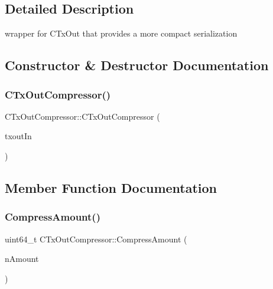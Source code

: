 \subsection{Detailed Description}
wrapper for C\+Tx\+Out that provides a more compact serialization 

\subsection{Constructor \& Destructor Documentation}
\mbox{\label{class_c_tx_out_compressor_a38ef1033989cd003de65598620d15cea}} 
\subsubsection{\texorpdfstring{C\+Tx\+Out\+Compressor()}{CTxOutCompressor()}}
{\footnotesize\ttfamily C\+Tx\+Out\+Compressor\+::\+C\+Tx\+Out\+Compressor (\begin{DoxyParamCaption}\item[{C\+Tx\+Out \&}]{txout\+In }\end{DoxyParamCaption})\hspace{0.3cm}{\ttfamily [inline]}}



\subsection{Member Function Documentation}
\mbox{\label{class_c_tx_out_compressor_a4141cec8885a2da956abb79130c963a8}} 
\subsubsection{\texorpdfstring{Compress\+Amount()}{CompressAmount()}}
{\footnotesize\ttfamily uint64\+\_\+t C\+Tx\+Out\+Compressor\+::\+Compress\+Amount (\begin{DoxyParamCaption}\item[{uint64\+\_\+t}]{n\+Amount }\end{DoxyParamCaption})\hspace{0.3cm}{\ttfamily [static]}}

